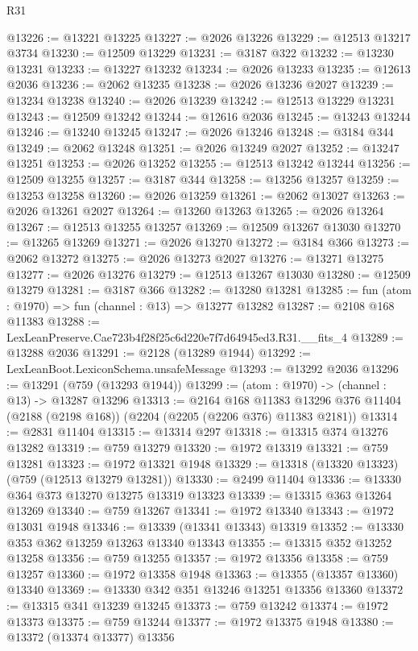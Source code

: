 \begin{lexlean}{R31}
\begin{coremodule}
@13226 := @13221 @13225
@13227 := @2026 @13226
@13229 := @12513 @13217 @3734
@13230 := @12509 @13229
@13231 := @3187 @322
@13232 := @13230 @13231
@13233 := @13227 @13232
@13234 := @2026 @13233
@13235 := @12613 @2036
@13236 := @2062 @13235
@13238 := @2026 @13236 @2027
@13239 := @13234 @13238
@13240 := @2026 @13239
@13242 := @12513 @13229 @13231
@13243 := @12509 @13242
@13244 := @12616 @2036
@13245 := @13243 @13244
@13246 := @13240 @13245
@13247 := @2026 @13246
@13248 := @3184 @344
@13249 := @2062 @13248
@13251 := @2026 @13249 @2027
@13252 := @13247 @13251
@13253 := @2026 @13252
@13255 := @12513 @13242 @13244
@13256 := @12509 @13255
@13257 := @3187 @344
@13258 := @13256 @13257
@13259 := @13253 @13258
@13260 := @2026 @13259
@13261 := @2062 @13027
@13263 := @2026 @13261 @2027
@13264 := @13260 @13263
@13265 := @2026 @13264
@13267 := @12513 @13255 @13257
@13269 := @12509 @13267 @13030
@13270 := @13265 @13269
@13271 := @2026 @13270
@13272 := @3184 @366
@13273 := @2062 @13272
@13275 := @2026 @13273 @2027
@13276 := @13271 @13275
@13277 := @2026 @13276
@13279 := @12513 @13267 @13030
@13280 := @12509 @13279
@13281 := @3187 @366
@13282 := @13280 @13281
@13285 := fun (atom : @1970) => fun (channel : @13) => @13277 @13282
@13287 := @2108 @168 @11383
@13288 := LexLeanPreserve.Cae723b4f28f25c6d220e7f7d64945ed3.R31.__fits_4
@13289 := @13288 @2036
@13291 := @2128 (@13289 @1944)
@13292 := LexLeanBoot.LexiconSchema.unsafeMessage
@13293 := @13292 @2036
@13296 := @13291 (@759 (@13293 @1944))
@13299 := (atom : @1970) -> (channel : @13) -> @13287 @13296
@13313 := @2164
    @168
    @11383
    @13296
    @376
    @11404
    (@2188 (@2198 @168))
    (@2204 (@2205 (@2206 @376) @11383 @2181))
@13314 := @2831 @11404
@13315 := @13314 @297
@13318 := @13315 @374 @13276 @13282
@13319 := @759 @13279
@13320 := @1972 @13319
@13321 := @759 @13281
@13323 := @1972 @13321 @1948
@13329 := @13318 (@13320 @13323) (@759 (@12513 @13279 @13281))
@13330 := @2499 @11404
@13336 := @13330 @364 @373 @13270 @13275 @13319 @13323
@13339 := @13315 @363 @13264 @13269
@13340 := @759 @13267
@13341 := @1972 @13340
@13343 := @1972 @13031 @1948
@13346 := @13339 (@13341 @13343) @13319
@13352 := @13330 @353 @362 @13259 @13263 @13340 @13343
@13355 := @13315 @352 @13252 @13258
@13356 := @759 @13255
@13357 := @1972 @13356
@13358 := @759 @13257
@13360 := @1972 @13358 @1948
@13363 := @13355 (@13357 @13360) @13340
@13369 := @13330 @342 @351 @13246 @13251 @13356 @13360
@13372 := @13315 @341 @13239 @13245
@13373 := @759 @13242
@13374 := @1972 @13373
@13375 := @759 @13244
@13377 := @1972 @13375 @1948
@13380 := @13372 (@13374 @13377) @13356

\end{coremodule}
\end{lexlean}
